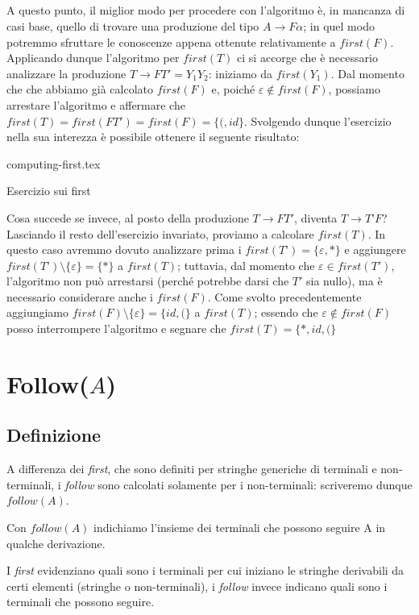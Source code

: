 \documentclass[class=book, crop=false, oneside, 12pt]{standalone}
\begin{document}
\subparagraph{}
A questo punto, il miglior modo per procedere con l'algoritmo è, in mancanza di casi base, quello di trovare una produzione del tipo \(A \rightarrow F\alpha\); in quel modo potremmo sfruttare le conoscenze appena ottenute relativamente a \(first(F)\). Applicando dunque l'algoritmo per \(first(T)\) ci si accorge che è necessario analizzare la produzione \(T \rightarrow FT' = Y_1Y_2\): iniziamo da \(first(Y_1)\). Dal momento che che abbiamo già calcolato \(first(F)\) e, poiché \(\varepsilon \notin first(F)\), possiamo arrestare l'algoritmo e affermare che \(first(T) = first(FT') = first(F) = \{(, id\}\). Svolgendo dunque l'esercizio nella sua interezza è possibile ottenere il seguente risultato:
\begin{table}[H]
	\centering
	{computing-first.tex}
    \caption{Esercizio sui first}
    \label{computing-first}
\end{table}
Cosa succede se invece, al posto della produzione \(T \to FT'\), diventa \(T \to T’F\)? Lasciando il resto dell'esercizio invariato, proviamo a calcolare \(first(T)\). In questo caso avremmo dovuto analizzare prima i \(first(T’) = \{\varepsilon, \ast\}\) e aggiungere \(first(T’) \setminus \{\varepsilon\} = \{\ast\}\) a \(first(T)\); tuttavia, dal momento che \(\varepsilon \in first(T')\), l’algoritmo non può arrestarsi (perché potrebbe darsi che \(T'\) sia nullo), ma è necessario considerare anche i \(first(F)\). Come svolto precedentemente aggiungiamo \(first(F) \setminus \{\varepsilon\} = \{id, (\}\) a \(first(T)\); essendo che \(\varepsilon \notin first(F)\) posso interrompere l'algoritmo e segnare che \(first(T) = \{\ast, id, (\}\)

\section{Follow(\(A\))}
\subsection{Definizione}
A differenza dei \emph{first}, che sono definiti per stringhe generiche di terminali e non-terminali, i \emph{follow} sono calcolati solamente per i non-terminali: scriveremo dunque \(follow(A)\).
\begin{definition}
    Con \(follow(A)\) indichiamo l'insieme dei terminali che possono seguire A in qualche derivazione.    
\end{definition}
I \emph{first} evidenziano quali sono i terminali per cui iniziano le stringhe derivabili da certi elementi (stringhe o non-terminali), i \emph{follow} invece indicano quali sono i terminali che possono seguire.
\end{document}
